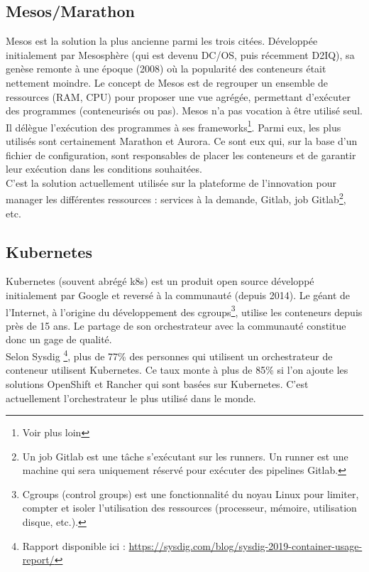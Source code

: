 \documentclass[11pt,fleqn]{book} %
\begin{document}
\subsection{Mesos/Marathon}
Mesos est la solution la plus ancienne parmi les trois citées. Développée initialement par Mesosphère (qui est devenu DC/OS, puis récemment D2IQ), sa genèse remonte à une époque (2008) où la popularité des conteneurs était nettement moindre. Le concept de Mesos est de regrouper un ensemble de ressources (RAM, CPU) pour proposer une vue agrégée, permettant d’exécuter des programmes (conteneurisés ou pas). Mesos n’a pas vocation à être utilisé seul. Il délègue l’exécution des programmes à ses frameworks\footnote{Voir plus loin}. Parmi eux, les plus utilisés sont certainement Marathon et Aurora. Ce sont eux qui, sur la base d’un fichier de configuration, sont responsables de placer les conteneurs et de garantir leur exécution dans les conditions souhaitées.\\

C'est la solution actuellement utilisée sur la plateforme de l'innovation pour manager les différentes ressources : services à la demande, Gitlab, job Gitlab\footnote{Un job Gitlab est une tâche s'exécutant sur les runners. Un runner est une machine qui sera uniquement réservé pour exécuter des pipelines Gitlab.}, etc. \\ 

\subsection{Kubernetes}
Kubernetes (souvent abrégé k8s) est un produit open source développé initialement par Google et reversé à la communauté (depuis 2014). Le géant de l’Internet, à l’origine du développement des cgroups\footnote{Cgroups (control groups) est une fonctionnalité du noyau Linux pour limiter, compter et isoler l'utilisation des ressources (processeur, mémoire, utilisation disque, etc.).}, utilise les conteneurs depuis près de 15 ans. Le partage de son orchestrateur avec la communauté constitue donc un gage de qualité. \\

Selon Sysdig \footnote{ Rapport disponible ici : \url{https://sysdig.com/blog/sysdig-2019-container-usage-report/}}, plus de 77\% des personnes qui utilisent un orchestrateur de conteneur utilisent Kubernetes. Ce taux monte à plus de 85\% si l'on ajoute les solutions OpenShift et Rancher qui sont basées sur Kubernetes. C'est actuellement l'orchestrateur le plus utilisé dans le monde.\\ 
\end{document}

